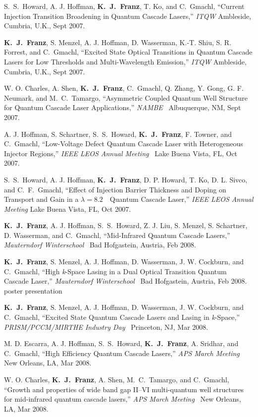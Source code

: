 \begin{list}{}{
  \setlength{\leftmargin}{0.25in}
  \setlength{\rightmargin}{0.25in}
  \setlength{\itemsep}{6pt}
}
\item S.~S.~Howard, A. J. Hoffman, \textbf{K.~J.~Franz}, T. Ko, and C.~Gmachl, ``Current Injection Transition Broadening in Quantum Cascade Lasers,'' \emph{ITQW} Ambleside, Cumbria, U.K., Sept 2007.
\item \textbf{K.~J.~Franz}, S. Menzel, A. J. Hoffman, D. Wasserman, K.-T. Shiu, S. R. Forrest, and C.~Gmachl, ``Excited State Optical Transitions in Quantum Cascade Lasers for Low Thresholds and Multi-Wavelength Emission,'' \emph{ITQW} Ambleside, Cumbria, U.K., Sept 2007.
\item W. O. Charles, A. Shen, \textbf{K.~J.~Franz}, C.~Gmachl, Q. Zhang, Y. Gong, G. F. Neumark, and M.~C.~Tamargo, ``Asymmetric Coupled Quantum Well Structure for Quantum Cascade Laser Applications,'' \emph{NAMBE}~ Albuquerque, NM, Sept 2007.
\item A. J. Hoffman, S. Schartner, S.~S.~Howard, \textbf{K.~J.~Franz}, F. Towner, and C.~Gmachl, ``Low-Voltage Defect Quantum Cascade Laser with Heterogeneous Injector  Regions,'' \emph{IEEE LEOS Annual Meeting}~ Lake Buena Vista, FL, Oct 2007.
\item S.~S.~Howard, A. J. Hoffman, \textbf{K.~J.~Franz}, D. P. Howard, T. Ko, D. L. Sivco, and  C.~F.~Gmachl, ``Effect of Injection Barrier Thickness and Doping on Transport and Gain in a $\lambda=8.2$~\um\ Quantum Cascade Laser,'' \emph{IEEE LEOS Annual Meeting}  Lake Buena Vista, FL, Oct 2007.
\item \textbf{K.~J.~Franz}, A. J. Hoffman, S.~S.~Howard, Z. J. Liu, S. Menzel, S. Schartner,  D. Wasserman, and C.~Gmachl, ``Mid-Infrared Quantum Cascade Lasers,''  \emph{Mauterndorf Winterschool}~ Bad Hofgastein, Austria, Feb 2008.
\item \textbf{K.~J.~Franz}, S. Menzel, A. J. Hoffman, D. Wasserman, J. W. Cockburn, and  C.~Gmachl, ``High \emph{k}-Space Lasing in a Dual Optical Transition Quantum Cascade Laser,'' \emph{Mauterndorf Winterschool}~ Bad Hofgastein, Austria, Feb 2008.  poster presentation
\item \textbf{K.~J.~Franz}, S. Menzel, A. J. Hoffman, D. Wasserman, J. W. Cockburn, and  C.~Gmachl, ``Excited State Quantum Cascade Lasers and Lasing in \emph{k}-Space,''  \emph{PRISM/PCCM/MIRTHE Industry Day}~ Princeton, NJ, Mar 2008.
\item M. D. Escarra, A. J. Hoffman, S.~S.~Howard, \textbf{K.~J.~Franz}, A. Sridhar, and C.~Gmachl, ``High Efficiency Quantum Cascade Lasers,'' \emph{APS March Meeting}~ New Orleans, LA, Mar 2008.
\item W. O. Charles, \textbf{K.~J.~Franz}, A. Shen, M.~C.~Tamargo, and C.~Gmachl, ``Growth and properties of wide band gap II--VI multi-quantum well structures for mid-infrared quantum cascade lasers,'' \emph{APS March Meeting}~ New Orleans, LA, Mar 2008.

\end{list}
